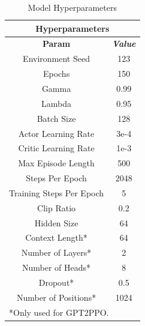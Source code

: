 \begin{table}[htbp]
    \caption{Model Hyperparameters}
    \begin{center}
        \begin{tabular}{|c|c|}
            \hline
            \multicolumn{2}{|c|}{\textbf{Hyperparameters}}     \\
            \hline
            \textbf{Param}           & \textbf{\textit{Value}} \\
            \hline
            Environment Seed         & 123                     \\
            Epochs                   & 150                     \\
            Gamma                    & 0.99                    \\
            Lambda                   & 0.95                    \\
            Batch Size               & 128                     \\
            Actor Learning Rate      & 3e-4                    \\
            Critic Learning Rate     & 1e-3                    \\
            Max Episode Length       & 500                     \\
            Steps Per Epoch          & 2048                    \\
            Training Steps Per Epoch & 5                       \\
            Clip Ratio               & 0.2                     \\
            Hidden Size              & 64                      \\
            Context Length*          & 64                      \\
            Number of Layers*        & 2                       \\
            Number of Heads*         & 8                       \\
            Dropout*                 & 0.5                     \\
            Number of Positions*     & 1024                    \\
            \hline
            \multicolumn{2}{l}{*Only used for GPT2PPO.}
        \end{tabular}
        \label{tab:hyperparameters}
    \end{center}
\end{table}

